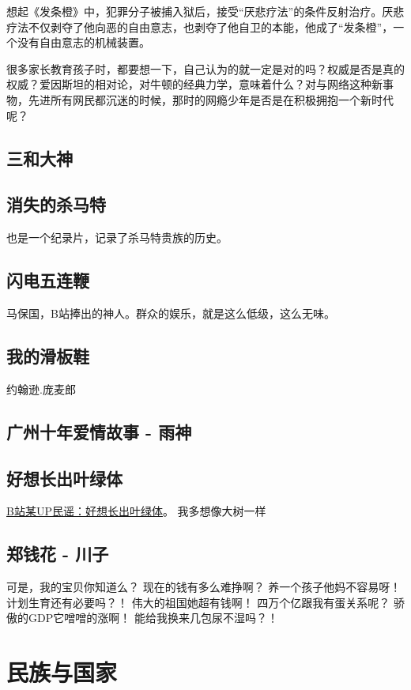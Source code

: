 \documentclass[fontset=founder]{ctexbook}
\begin{document}
想起《发条橙》中，犯罪分子被捕入狱后，接受“厌悲疗法”的条件反射治疗。厌悲疗法不仅剥夺了他向恶的自由意志，也剥夺了他自卫的本能，他成了“发条橙”，一个没有自由意志的机械装置。

很多家长教育孩子时，都要想一下，自己认为的就一定是对的吗？权威是否是真的权威？爱因斯坦的相对论，对牛顿的经典力学，意味着什么？对与网络这种新事物，先进所有网民都沉迷的时候，那时的网瘾少年是否是在积极拥抱一个新时代呢？

\section{三和大神}

\section{消失的杀马特}
也是一个纪录片，记录了杀马特贵族的历史。

\section{闪电五连鞭}
马保国，B站捧出的神人。群众的娱乐，就是这么低级，这么无味。


\section{我的滑板鞋}
约翰逊.庞麦郎

\section{广州十年爱情故事 - 雨神}

\section{好想长出叶绿体}
\href{https://www.bilibili.com/video/av415856325/}{B站某UP民谣：好想长出叶绿体}。
我多想像大树一样

\section{郑钱花 - 川子}
可是，我的宝贝你知道么？
现在的钱有多么难挣啊？
养一个孩子他妈不容易呀！
计划生育还有必要吗？！
伟大的祖国她超有钱啊！
四万个亿跟我有蛋关系呢？
骄傲的GDP它噌噌的涨啊！
能给我换来几包尿不湿吗？！

\chapter{民族与国家}
\end{document}

